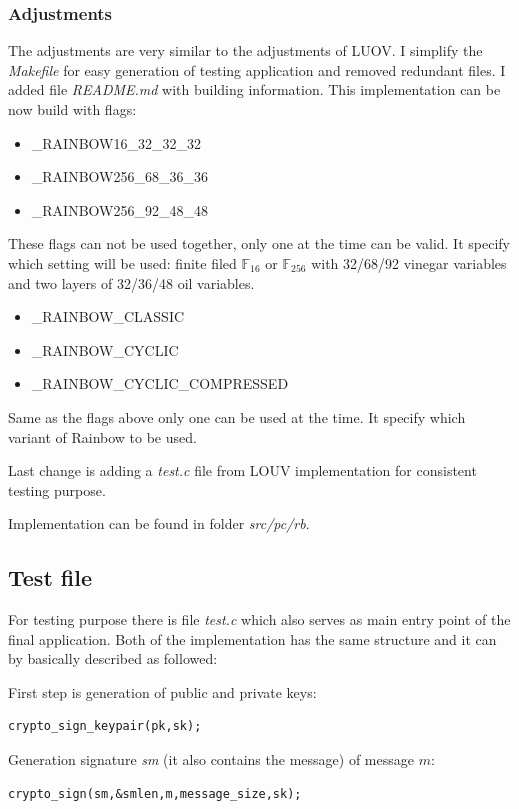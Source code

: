 \documentclass[thesis=M,english]{FITthesis}[2019/12/23]
\begin{document}
\subsubsection{Adjustments}
The adjustments are very similar to the adjustments of LUOV. I simplify the \textit{Makefile} for easy generation of testing application and removed redundant files. I added file \textit{README.md} with building information. This implementation can be now build with flags:

\begin{itemize}
\item	\_RAINBOW16\_32\_32\_32 
\item	\_RAINBOW256\_68\_36\_36 
\item	\_RAINBOW256\_92\_48\_48 
\end{itemize}
These flags can not be used together, only one at the time can be valid. It specify which setting will be used: finite filed $\mathbb{F}_{16}$ or $\mathbb{F}_{256}$ with 32/68/92 vinegar variables and two layers of 32/36/48 oil variables.

\begin{itemize}
\item	\_RAINBOW\_CLASSIC  
\item	\_RAINBOW\_CYCLIC 
\item	\_RAINBOW\_CYCLIC\_COMPRESSED 
\end{itemize}
Same as the flags above only one can be used at the time. It specify which variant of Rainbow to be used.

\bigskip
\noindent
Last change is adding a \textit{test.c} file from LOUV implementation for consistent testing purpose.

\bigskip
\noindent
Implementation can be found in folder \textit{src/pc/rb}.  

\subsection{Test file}
For testing purpose there is file \textit{test.c} which also serves as main entry point of the final application. Both of the implementation has the same structure and it can by basically described as followed:

\bigskip
\noindent
First step is generation of public and private keys:
\begin{lstlisting}[frame=single]
crypto_sign_keypair(pk,sk);
\end{lstlisting}

\bigskip
\noindent
Generation signature \textit{sm} (it also contains the message) of message $m$:
\begin{lstlisting}[frame=single]
crypto_sign(sm,&smlen,m,message_size,sk);
\end{lstlisting}
\end{document}
